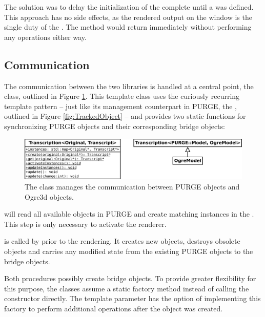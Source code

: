 			The solution was to delay the initialization of the complete  until a  was defined. This approach has no side effects, as the rendered output on the window is the single duty of the . The method  would return immediately without performing any operations either way.
			
	\subsection{Communication}

		The communication between the two libraries is handled at a central point, the  class, outlined in Figure \ref{fig:Transcription}. This template class uses the curiously recurring template pattern -- just like its management counterpart in PURGE, the , outlined in Figure \ref{fig:TrackedObject} -- and provides two static functions for synchronizing PURGE objects and their corresponding bridge objects:

		\begin{figure}[htbp]
			\centering
			\includegraphics[width=14cm]{images/Transcription.png}
			\caption{The  class manages the communication between PURGE objects and Ogre3d objects.}
			\label{fig:Transcription}
		\end{figure}

		\begin{smalllist}
			\item {} will read all available objects in PURGE and create matching instances in the . This step is only necessary to activate the renderer.
			\item {} is called by  prior to the rendering. It creates new objects, destroys obsolete objects and carries any modified state from the existing PURGE objects to the bridge objects.
		\end{smalllist}

		Both procedures possibly create bridge objects. To provide greater flexibility for this purpose, the classes assume a static factory method instead of calling the constructor directly. The  template parameter has the option of implementing this factory to perform additional operations after the object was created.

